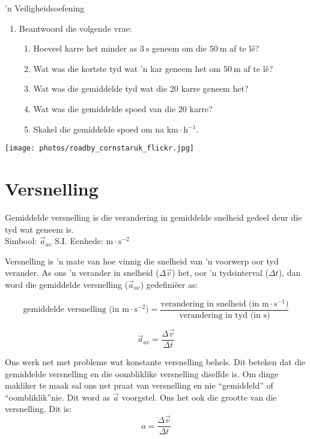\begin{Investigation}{ 'n Veiligheidsoefening}
\begin{enumerate}[noitemsep, label=\textbf{\arabic*}. ]
\item Beantwoord die volgende vrae:
\begin{enumerate}[noitemsep, label=\textbf{\alph*}. ] 
    \item Hoeveel karre het minder as $3~\text{s}$ geneem om die $50~\text{m}$ af te l\^e?
    \item Wat was die kortste tyd wat 'n kar geneem het om $50~\text{m}$ af te l\^e?
    \item Wat was die gemiddelde tyd wat die 20 karre geneem het?
    \item Wat was die gemiddelde spoed van die 20 karre?
    \item Skakel die gemiddelde spoed om na $\text{km}\ensuremath{\cdot}\text{h}{}^{-1}$.
\end{enumerate}
        \end{enumerate}
\begin{center}
\texttt{[image: photos/roadby\_cornstaruk\_flickr.jpg]}
\end{center}
\end{Investigation}



\section{Versnelling}
 {Gemiddelde versnelling is die verandering in gemiddelde snelheid gedeel deur die tyd wat geneem is.\\
Simbool: $\vec{a}_{av}$\hspace{2cm} S.I. Eenhede: $\text{m} \cdot \text{s}^{-2}$ } 

Versnelling is 'n mate van hoe vinnig  die snelheid van 'n voorwerp oor tyd verander. As ons 'n verander in snelheid ($\Delta \vec{v}$) het, oor 'n tydsinterval ($\Delta t$), dan word die gemiddelde versnelling ($\vec{a}_{av}$) gedefini\"eer as:

\begin{equation*}
    \text{gemiddelde versnelling (in m} \cdot {\text{s}}^{-2}\text{)} =\frac{\text{verandering in snelheid (in m} \cdot {\text{s}}^{-1}\text{)}}{\text{verandering in tyd (in s)}}
      \end{equation*}
        
    \begin{equation*}
    \vec{a}_{av}=\frac{\Delta \vec{v}}{\Delta t}
      \end{equation*}

Ons werk net met probleme wat konstante versnelling behels. Dit beteken dat die gemiddelde versnelling en die oombliklike versnelling diselfde is. Om dinge makliker te maak sal ons net praat van versnelling en nie ``gemiddeld'' of ``oombliklik''nie. Dit word as $\vec{a}$ voorgstel. Ons het ook die grootte van die versnelling. Dit is:
\begin{equation*}
    a=\frac{\Delta \vec{v}}{\Delta t}
\end{equation*}

